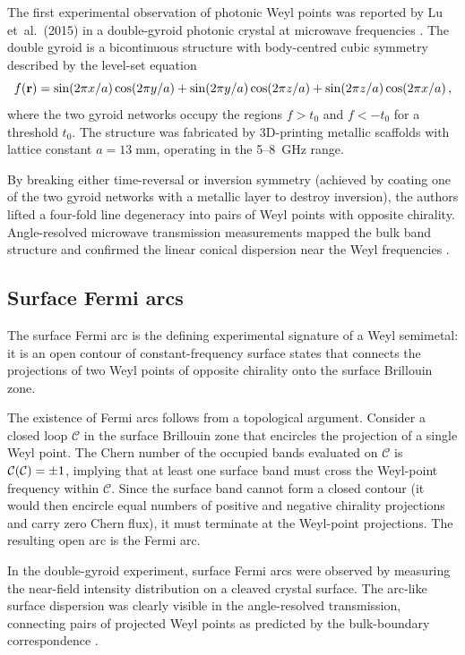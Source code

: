 The first experimental observation of photonic Weyl points was
reported by Lu et~al.\ (2015) in a double-gyroid photonic crystal
at microwave frequencies \cite{price2022roadmap}.  The double
gyroid is a bicontinuous structure with body-centred cubic symmetry
described by the level-set equation
\begin{equation}\label{eq:ch15-gyroid-level-set}
  f(\mathbf{r}) = \sin(2\pi x/a)\cos(2\pi y/a)
  + \sin(2\pi y/a)\cos(2\pi z/a)
  + \sin(2\pi z/a)\cos(2\pi x/a)\,,
\end{equation}
where the two gyroid networks occupy the regions $f>t_0$ and
$f<-t_0$ for a threshold $t_0$.  The structure was fabricated by
3D-printing metallic scaffolds with lattice constant $a=13\;\mathrm{mm}$,
operating in the 5--8~GHz range.

By breaking either time-reversal or inversion symmetry (achieved by
coating one of the two gyroid networks with a metallic layer to
destroy inversion), the authors lifted a four-fold line degeneracy
into pairs of Weyl points with opposite chirality.  Angle-resolved
microwave transmission measurements mapped the bulk band structure
and confirmed the linear conical dispersion near the Weyl frequencies
\cite{ozawa2018topological}.

\subsection{Surface Fermi arcs}
\label{sec:ch15-fermi-arcs-exp}

The surface Fermi arc is the defining experimental signature of a
Weyl semimetal: it is an open contour of constant-frequency surface
states that connects the projections of two Weyl points of opposite
chirality onto the surface Brillouin zone.

The existence of Fermi arcs follows from a topological argument.
Consider a closed loop $\mathcal{C}$ in the surface Brillouin zone
that encircles the projection of a single Weyl point.  The Chern
number of the occupied bands evaluated on $\mathcal{C}$ is
$\mathcal{C}(\mathcal{C})=\pm 1$, implying that at least one surface
band must cross the Weyl-point frequency within $\mathcal{C}$.
Since the surface band cannot form a closed contour (it would then
encircle equal numbers of positive and negative chirality
projections and carry zero Chern flux), it must terminate at the
Weyl-point projections.  The resulting open arc is the Fermi arc.

In the double-gyroid experiment, surface Fermi arcs were observed by
measuring the near-field intensity distribution on a cleaved crystal
surface.  The arc-like surface dispersion was clearly visible in the
angle-resolved transmission, connecting pairs of projected Weyl
points as predicted by the bulk-boundary correspondence
\cite{ozawa2018topological,price2022roadmap}.

